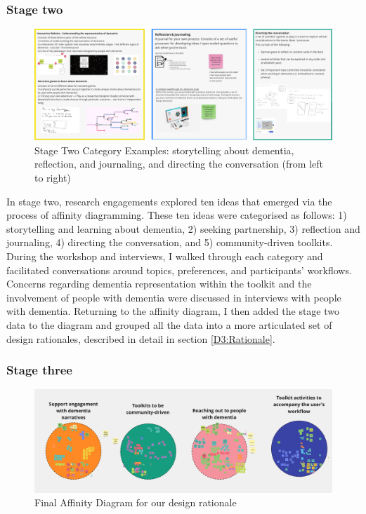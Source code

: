 \subsubsection{Stage two}
\begin{figure}[h]
\centering
\includegraphics[width=1\linewidth]{Images/D3Toolkit/Fig2.png}
\caption{Stage Two Category Examples: storytelling about dementia, reflection, and journaling, and directing the conversation (from left to right)}
\label{fig:StageTwoDesigns}
\end{figure}
In stage two, research engagements explored ten ideas that emerged via the process of affinity diagramming. These ten ideas were categorised as follows: 1) storytelling and learning about dementia, 2) seeking partnership, 3) reflection and journaling, 4) directing the conversation, and 5) community-driven toolkits. During the workshop and interviews, I walked through each category and facilitated conversations around topics, preferences, and participants’ workflows. Concerns regarding dementia representation within the toolkit and the involvement of people with dementia were discussed in interviews with people with dementia. Returning to the affinity diagram, I then added the stage two data to the diagram and grouped all the data into a more articulated set of design rationales, described in detail in section \ref{D3:Rationale}.


\subsubsection{Stage three}
\begin{figure}[h]
\centering
\includegraphics[width=1\linewidth]{Images/D3Toolkit/Fig3.png}
\caption{Final Affinity Diagram for our design rationale}
\label{fig:AffinityDiagram}
\end{figure}

